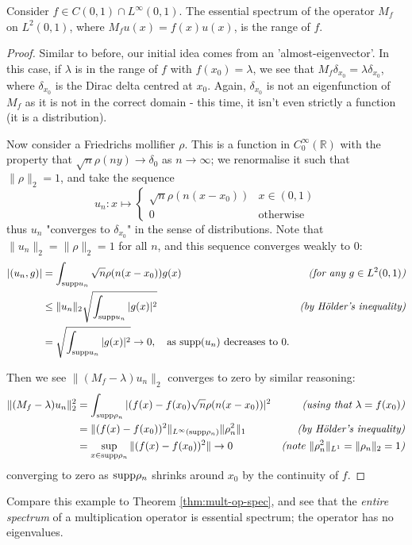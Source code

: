 \documentclass[../main.tex]{subfiles}
\begin{document}
\begin{example}
  Consider $f \in C(0, 1) \cap L^\infty (0, 1)$. The essential spectrum of the
  operator $M_f$ on $L^2(0, 1)$, where $M_f u(x) = f(x)u(x)$, is the range of $f$.
\end{example}
\begin{proof}
Similar to before, our initial idea comes from an 'almost-eigenvector'. In this
case, if $\lambda$ is in the range of $f$ with $f(x_0) = \lambda$, we
see that $M_f \delta_{x_0} = \lambda \delta_{x_0}$, where $\delta_{x_0}$
is the Dirac delta centred at $x_0$. Again, $\delta_{x_0}$ is not an eigenfunction of
$M_f$ as it is not in the correct domain - this time, it isn't even
strictly a function (it is a distribution).

Now consider a Friedrichs mollifier $\rho$. This is a function in
$C^\infty_0(\mathbb{R})$ with the property that $\sqrt{n}\rho(ny)
\rightarrow \delta_0$ as $n \rightarrow \infty$; we renormalise it such
that $\|\rho\|_2 = 1$, and take the sequence 
$$u_n: x \mapsto 
\begin{cases}
  \sqrt{n}\rho(n(x-x_0)) & x \in (0, 1) \\
  0 & \text{otherwise}
\end{cases}
$$
thus $u_n$ "converges to $\delta_{x_0}$" in the sense of distributions. Note
that $\|u_n\|_2 = \|\rho\|_2 = 1$ for all $n$, and this sequence
converges weakly to 0: 
\begin{align*}
|( u_n, g )| & = \int_{\mathrm{supp}{u_n}}\sqrt{n}\rho(n(x-x_0))g(x) 
	       & \text{\emph{(for any $g \in L^2(0, 1)$)}} \\
& \leq \|u_n\|_2 \sqrt{\int_{\mathrm{supp}{u_n}} |g(x)|^2} 
  & \text{\emph{(by H\"older's inequality)}} \\
& = \sqrt{\int_{\mathrm{supp}{u_n}} |g(x)|^2} \rightarrow 0, 
  \quad \text{as $\mathrm{supp}(u_n)$ decreases to 0.} &
\end{align*}

Then we see $\|(M_f - \lambda)u_n\|_2$ converges to zero by similar reasoning:
\begin{align*}
\|(M_f - \lambda)u_n\|^2_2 & = \int_{\mathrm{supp} \rho_n} |(f(x) - f(x_0) \sqrt{n} \rho(n(x-x_0))|^2 
			     & \text{\emph{(using that $\lambda = f(x_0)$)}} \\
& = \|(f(x) - f(x_0))^2\|_{L^\infty (\mathrm{supp} \rho_n)} \|\rho_n^2\|_1 
  & \text{\emph{(by H\"older's inequality)}} \\
& = \sup_{x \in \mathrm{supp} \rho_n} \|(f(x) - f(x_0))^2\| \rightarrow 0 
  & \text{\emph{(note $\|\rho_n^2\|_{L^1} = \|\rho_n\|_2 = 1$)}} \\
\end{align*}
converging to zero as $\mathrm{supp} \rho_n$ shrinks around $x_0$ by the continuity of $f$.
\end{proof}
Compare this example to Theorem \ref{thm:mult-op-spec}, and see that the
\emph{entire spectrum} of a multiplication operator is essential spectrum; the
operator has no eigenvalues.
\end{document}
